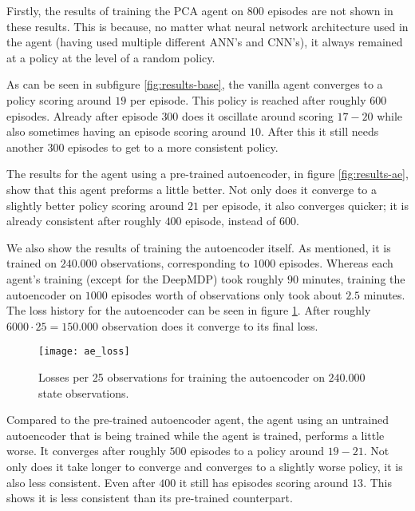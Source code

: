 Firstly, the results of training the PCA agent on $800$ episodes are not shown in these results. This is because, no matter what neural network architecture used in the agent (having used multiple different ANN's and CNN's), it always remained at a policy at the level of a random policy.

As can be seen in subfigure \ref{fig:results-base}, the vanilla agent converges to a policy scoring around $19$ per episode. This policy is reached after roughly $600$ episodes. Already after episode $300$ does it oscillate around scoring $17-20$ while also sometimes having an episode scoring around $10$. After this it still needs another $300$ episodes to get to a more consistent policy.

The results for the agent using a pre-trained autoencoder, in figure \ref{fig:results-ae}, show that this agent preforms a little better. Not only does it converge to a slightly better policy scoring around $21$ per episode, it also converges quicker; it is already consistent after roughly $400$ episode, instead of $600$. 

 We also show the results of training the autoencoder itself. As mentioned, it is trained on $240.000$ observations, corresponding to $1000$ episodes. Whereas each agent's training (except for the DeepMDP) took roughly $90$ minutes, training the autoencoder on $1000$ episodes worth of observations only took about $2.5$ minutes. The loss history for the autoencoder can be seen in figure \ref{fig:ae-loss}. After roughly $6000 \cdot 25 = 150.000$ observation does it converge to its final loss. %

\begin{figure}[h]
    \centering
    \texttt{[image: ae\_loss]}
    \caption{Losses per 25 observations for training the autoencoder on $240.000$ state observations.}
    \label{fig:ae-loss}
\end{figure}

Compared to the pre-trained autoencoder agent, the agent using an untrained autoencoder that is being trained while the agent is trained, performs a little worse. It converges after roughly $500$ episodes to a policy around $19-21$. Not only does it take longer to converge and converges to a slightly worse policy, it is also less consistent. Even after $400$ it still has episodes scoring around $13$. This shows it is less consistent than its pre-trained counterpart.

